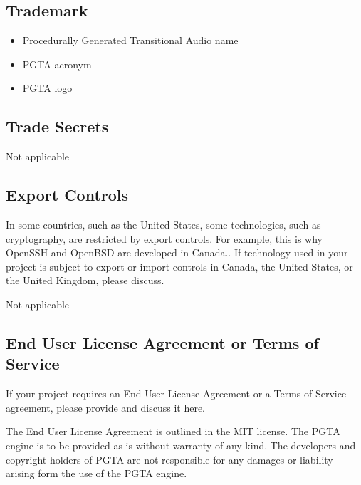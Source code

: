 \documentclass{tufte-handout}
\begin{document}
\subsection{Trademark}

\begin{itemize}
    \item Procedurally Generated Transitional Audio name 
    \item PGTA acronym
    \item PGTA logo
\end{itemize}

\subsection{Trade Secrets}

Not applicable

\subsection{Export Controls} 

In some countries, such as the United States, some technologies, such
as cryptography, are restricted by export controls. For example, this
is why OpenSSH and OpenBSD are developed in
Canada..
%
If technology used in your project is subject to export or import
controls in Canada, the United States, or the United Kingdom, please
discuss.


Not applicable 



\subsection{End User License Agreement or Terms of Service}

If your project requires an End User License Agreement or a Terms of
Service agreement, please provide and discuss it here.


The End User License Agreement is outlined in the MIT license. The PGTA engine is to be provided as is without 
warranty of any kind. The developers and copyright holders of PGTA are not responsible for any damages or liability
arising form the use of the PGTA engine. 
\end{document}
